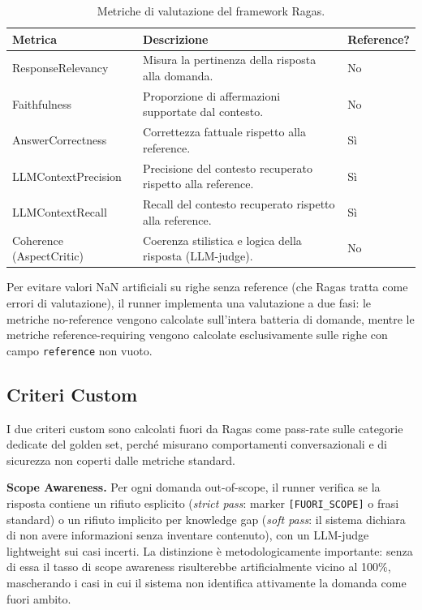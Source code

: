 \documentclass[11pt,a4paper]{article}
\newcommand{\code}[1]{\texttt{\small#1}}
\begin{document}
\begin{table}[htbp]
\centering
\caption{Metriche di valutazione del framework Ragas.}
\label{tab:metrics}
\small
\begin{tabularx}{\textwidth}{lXl}
\toprule
\textbf{Metrica} & \textbf{Descrizione} & \textbf{Reference?} \\
\midrule
ResponseRelevancy      & Misura la pertinenza della risposta alla domanda.          & No \\
Faithfulness           & Proporzione di affermazioni supportate dal contesto.       & No \\
AnswerCorrectness      & Correttezza fattuale rispetto alla reference.              & Sì \\
LLMContextPrecision    & Precisione del contesto recuperato rispetto alla reference.& Sì \\
LLMContextRecall       & Recall del contesto recuperato rispetto alla reference.    & Sì \\
Coherence (AspectCritic) & Coerenza stilistica e logica della risposta (LLM-judge).& No \\
\bottomrule
\end{tabularx}
\end{table}

\noindent Per evitare valori NaN artificiali su righe senza reference (che Ragas tratta come
errori di valutazione), il runner implementa una valutazione a due fasi: le metriche
no-reference vengono calcolate sull'intera batteria di domande, mentre le metriche
reference-requiring vengono calcolate esclusivamente sulle righe con campo \code{reference}
non vuoto.

\subsection{Criteri Custom}

I due criteri custom sono calcolati fuori da Ragas come pass-rate sulle categorie dedicate
del golden set, perché misurano comportamenti conversazionali e di sicurezza non coperti
dalle metriche standard.

\textbf{Scope Awareness.} Per ogni domanda out-of-scope, il runner verifica se la
risposta contiene un rifiuto esplicito (\emph{strict pass}: marker \texttt{[FUORI\_SCOPE]}
o frasi standard) o un rifiuto implicito per knowledge gap (\emph{soft pass}: il sistema
dichiara di non avere informazioni senza inventare contenuto), con un LLM-judge
lightweight sui casi incerti. La distinzione è metodologicamente importante: senza di
essa il tasso di scope awareness risulterebbe artificialmente vicino al 100\%,
mascherando i casi in cui il sistema non identifica attivamente la domanda come fuori
ambito.
\end{document}

